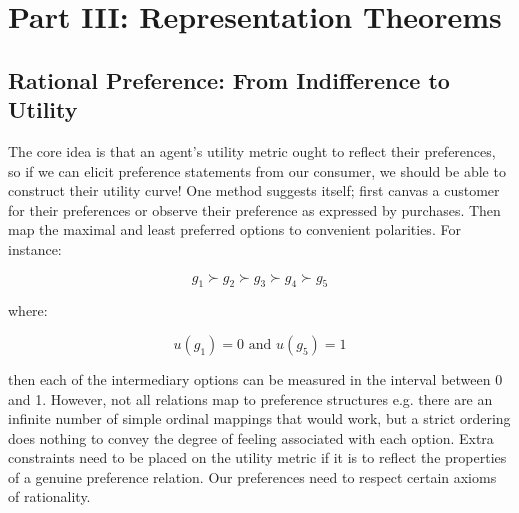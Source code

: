 \documentclass{tufte-handout}
\begin{document}
\section{\textbf{Part III: Representation Theorems}}

\subsection{Rational Preference: From Indifference to Utility}
\label{sec:Representation}

The core idea is that an agent's utility metric ought to reflect their preferences, so if we can elicit preference statements from our consumer, we should be able to construct their utility curve! One method suggests itself; first canvas a customer for their preferences or observe their preference as expressed by purchases. Then map the maximal and least preferred options to convenient polarities. For instance:

$$ g_{1} \succ g_{2} \succ g_{3} \succ g_{4} \succ g_{5} $$

\noindent where:

$$ u(g_{1}) = 0 \text{ and } u(g_{5}) = 1 $$

\noindent then each of the intermediary options can be measured in the interval between 0 and 1. However, not all relations map to preference structures e.g. there are an infinite number of simple ordinal mappings that would work, but a strict ordering does nothing to convey the degree of feeling associated with each option. Extra constraints need to be placed on the utility metric if it is to reflect the properties of a genuine preference relation. Our preferences need to respect certain axioms of rationality. 
\end{document}
